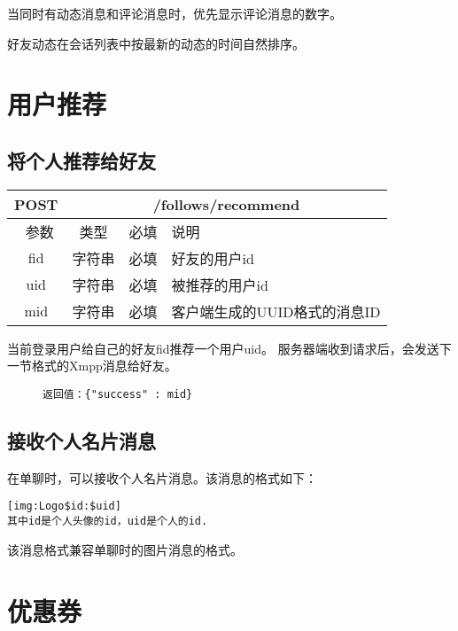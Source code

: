 当同时有动态消息和评论消息时，优先显示评论消息的数字。

好友动态在会话列表中按最新的动态的时间自然排序。






\section{用户推荐}
\subsection{ 将个人推荐给好友}
\begin{table}[H]
   \begin{center}
\begin{tabular}{|c|c|c|p{12cm}|}
\hline
POST & \multicolumn{3}{|c|}{/follows/recommend} \\
\hline\hline
 \  参数  & 类型 & 必填 &  说明  \\
\hline
 fid  & 字符串 & 必填 &  好友的用户id\\
 \hline
 uid  & 字符串 & 必填 &  被推荐的用户id\\
\hline
 mid  & 字符串 & 必填 &  客户端生成的UUID格式的消息ID\\
\hline
\end{tabular}
   \end{center}
\end{table}
当前登录用户给自己的好友fid推荐一个用户uid。
服务器端收到请求后，会发送下一节格式的Xmpp消息给好友。

\begin{figure}[H]
\begin{verbatim}
返回值：{"success" : mid}
\end{verbatim}
\end{figure}


\subsection{接收个人名片消息}
在单聊时，可以接收个人名片消息。该消息的格式如下：
\begin{verbatim}
[img:Logo$id:$uid]
其中id是个人头像的id，uid是个人的id.
\end{verbatim}
该消息格式兼容单聊时的图片消息的格式。


\section{优惠券}

